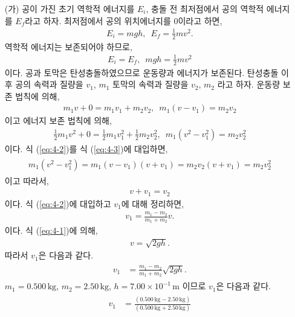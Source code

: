 \documentclass[floatfix,nofootinbib,superscriptaddress,fleqn]{revtex4-2}
\begin{document}
\begin{itemize}
  \item[(가)] 공이 가진 초기 역학적 에너지를 $E_i$, 충돌 전 최저점에서 
공의 역학적 에너지를 $E_f$라고 하자. 최저점에서 공의 위치에너지를 0이라고 하면,
\begin{align}
  E_i = mgh,\,\,\, E_f=\frac{1}{2}mv^2.
\end{align}
역학적 에너지는 보존되어야 하므로,
\begin{align}\label{eq:4-1}
  E_i = E_f,\,\,\, mgh=\frac{1}{2}mv^2
\end{align}
이다. 공과 토막은 탄성충돌하였으므로 운동량과 에너지가 보존된다. 
탄성충돌 이후 공의 속력과 질량을 $v_1$, $m_1$ 토막의 속력과 질량을 $v_2$, $m_2$ 라고 
하자. 운동량 보존 법칙에 의해,
\begin{align}\label{eq:4-2}
  m_1v+0 = m_1v_1+m_2v_2,\,\,\,m_1(v-v_1)=m_2v_2
\end{align}
이고 에너지 보존 법칙에 의해,
\begin{align}\label{eq:4-3}
  \frac{1}{2}m_1v^2+0 = \frac{1}{2}m_1v_1^2+\frac{1}{2}m_2v_2^2
  ,\,\,\,  m_1(v^2-v_1^2) =m_2v_2^2
\end{align}
이다. 식 (\ref{eq:4-2})를 식 (\ref{eq:4-3})에 대입하면,
\begin{align}
  \begin{split}
    m_1(v^2-v^2_1)=m_1(v-v_1)(v+v_1)=m_2v_2(v+v_1)=m_2v_2^2
  \end{split}
\end{align}
이고 따라서,
\begin{align}\label{eq:4-4}
  v+v_1 = v_2
\end{align}
이다. 식 (\ref{eq:4-2})에 대입하고 $v_1$에 대해 정리하면,
\begin{align}
  v_1 = \frac{m_1-m_2}{m_1+m_2}v.
\end{align}
이다. 식 (\ref{eq:4-1})에 의해,
\begin{align}
  v = \sqrt{2gh}.
\end{align}
따라서 $v_1$은 다음과 같다.
\begin{align}
  \begin{split}
    v_1 &= \frac{m_1-m_2}{m_1+m_2}\sqrt{2gh}.
  \end{split}
\end{align}
$m_1= 0.500\,\mathrm{kg}$, $m_2 = 2.50\,\mathrm{kg}$, 
$h=7.00\times 10^{-1}\,\mathrm{m}$ 이므로 $v_1$은 다음과 같다.
\begin{align}
  \begin{split}
    v_1 &= \frac{(0.500\,\mathrm{kg}-2.50\,\mathrm{kg})}
    {(0.500\,\mathrm{kg}+2.50\,\mathrm{kg})}

\end{split}
\end{align}
\end{itemize}
\end{document}

